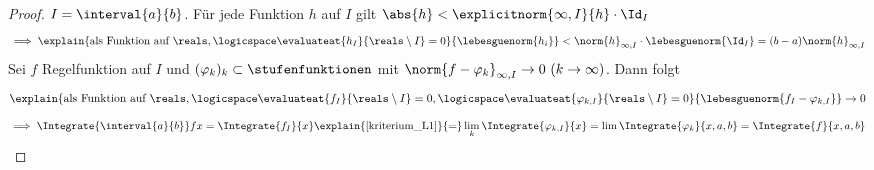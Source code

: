 \begin{proof}
    \(I=\interval{a}{b}\). Für jede Funktion \(h\) auf \(I\) gilt \(\abs{h}<\explicitnorm{\infty,I}{h}\cdot \Id_I\)
    \begin{equation*}
        \implies\explain{\text{als Funktion auf }\reals,\logicspace \evaluateat{h_I}{\reals\setminus I}=0}{\lebesguenorm{h_i}}
        <\norm{h}_{\infty,I}\cdot \lebesguenorm{\Id_I}=(b-a)\norm{h}_{\infty,I}
    \end{equation*}
    Sei \(f\) Regelfunktion auf \(I\) und \((\varphi_k)_k\subset\stufenfunktionen\) mit \(\norm{f-\varphi_k}_{\infty,I}\to 0\ (k\to\infty)\).
    Dann folgt 
    \begin{equation*}
        \explain{
            \text{als Funktion auf } \reals, \logicspace 
            \evaluateat{f_I}{\reals\setminus I}=0,\logicspace\evaluateat{\varphi_{k,I}}{\reals\setminus I}=0
        }{\lebesguenorm{f_I-\varphi_{k,I}}}\to 0
    \end{equation*}
    \begin{equation*}
        \implies {\Integrate{\interval{a}{b}}f}{x}=\Integrate{ f_I}{x}\explain{\ref{kriterium_L1}}{=}
        \lim_k\Integrate{ \varphi_{k,I}}{x}=\lim\Integrate{\varphi_k}{x,a,b}=\Integrate{f}{x,a,b}
    \end{equation*}
\end{proof}
